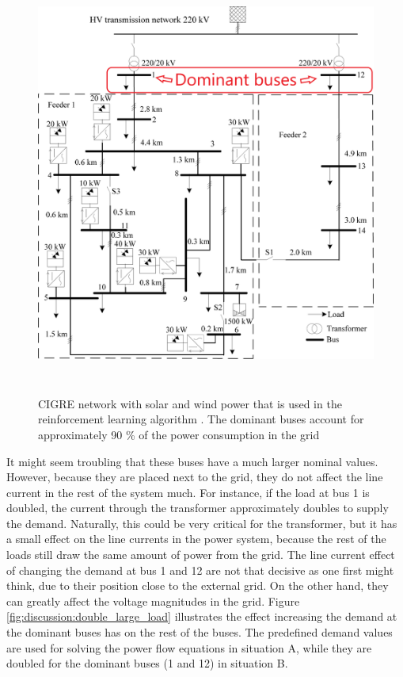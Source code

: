 \documentclass[class=book, crop=false]{standalone}
\begin{document}
\begin{figure}[ht]
    \center
    \includegraphics[height=14cm, width=13.5cm]{figures/cigre_network_dominant.png}
    \caption[size = 9]{CIGRE network with solar and wind power that is used in the reinforcement learning algorithm \cite{cigre}. The dominant buses account for approximately 90 \% of the power consumption in the grid}
    \label{fig:discussion:cigre_network_dominant}
\end{figure}
It might seem troubling that these buses have a much larger nominal values. However, because they are placed next to the grid, they do not affect the line current in the rest of the system much. For instance, if the load at bus 1 is doubled, the current through the transformer approximately doubles to supply the demand. Naturally, this could be very critical for the transformer, but it has a small effect on the line currents in the power system, because the rest of the loads still draw the same amount of power from the grid. The line current effect of changing the demand at bus 1 and 12 are not that decisive as one first might think, due to their position close to the external grid. On the other hand, they can greatly affect the voltage magnitudes in the grid. Figure \ref{fig:discussion:double_large_load} illustrates the effect increasing the demand at the dominant buses has on the rest of the buses. The predefined demand values are used for solving the power flow equations in situation A, while they are doubled for the dominant buses (1 and 12) in situation B.
\end{document}
